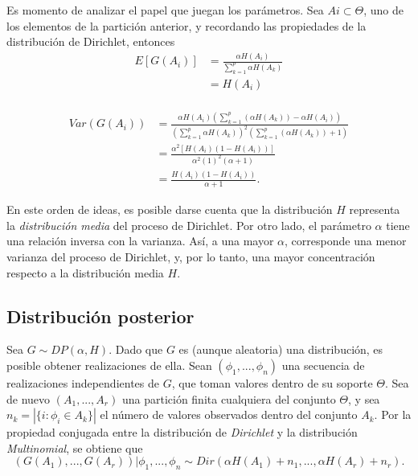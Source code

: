 Es momento de analizar el papel que juegan los par\'ametros. Sea $Ai \subset \Theta$, uno de los elementos de la partici\'on anterior, y recordando las propiedades de la distribuci\'on de Dirichlet, entonces
\begin{equation*}
\begin{aligned}
    E[G(A_i)] 
    &= \frac{\alpha H(A_i)}{\sum_{k=1}^p \alpha H(A_k)} \\
    &= H(A_i) \\
\end{aligned}
\end{equation*}

\begin{equation*}
\begin{aligned}
    Var(G(A_i)) 
    &= \frac{\alpha H(A_i)\left(\sum_{k=1}^p(\alpha H(A_k)) - \alpha H(A_i)\right)}
       {\left(\sum_{k=1}^p \alpha H(A_k)\right)^2\left(\sum_{k=1}^p(\alpha H(A_k)) + 1\right)} \\
    &= \frac{\alpha^2 [H(A_i)(1 - H(A_i))]}
       {\alpha^2 (1)^2(\alpha + 1)} \\
    &= \frac{H(A_i)(1 - H(A_i))}
       {\alpha + 1}.
\end{aligned}
\end{equation*}

En este orden de ideas, es posible darse cuenta que la distribuci\'on $H$ representa la \textit{distribuci\'on media} del proceso de Dirichlet. Por otro lado, el par\'ametro $\alpha$ tiene una relaci\'on inversa con la varianza. As\'i, a una mayor $\alpha$, corresponde una menor varianza del proceso de Dirichlet, y, por lo tanto, una mayor concentraci\'on respecto a la distribuci\'on media $H$. 

\subsection{Distribuci\'on posterior}

Sea $G \sim DP(\alpha,H)$. Dado que $G$ es (aunque aleatoria) una distribuci\'on, es posible obtener realizaciones de ella. Sean $(\phi_1,..., \phi_n)$ una secuencia de realizaciones independientes de $G$, que toman valores dentro de su soporte $\Theta$. Sea de nuevo $(A_1,...,A_r)$ una partici\'on finita cualquiera del conjunto $\Theta$, y sea $n_k = |\{i: \phi_i \in A_k\}|$ el n\'umero de valores observados dentro del conjunto $A_k$. Por la propiedad conjugada entre la distribuci\'on de \textit{Dirichlet} y la distribuci\'on \textit{Multinomial}, se obtiene que
\begin{equation*}
   (G(A_1),...,G(A_r))|\phi_1,...,\phi_n \sim Dir(\alpha H(A_1) + n_1,...,\alpha H(A_r) + n_r). 
\end{equation*}

